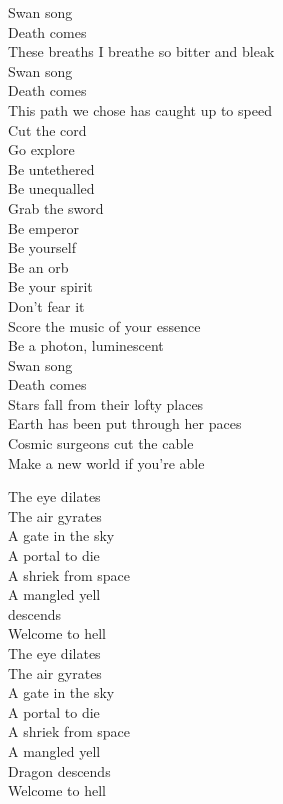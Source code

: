 Swan song\\
Death comes\\
These breaths I breathe so bitter and bleak\\
Swan song\\
Death comes\\
This path we chose has caught up to speed\\

Cut the cord\\
Go explore\\
Be untethered\\
Be unequalled\\
Grab the sword\\
Be emperor\\
Be yourself\\
Be an orb\\
Be your spirit\\
Don't fear it\\
Score the music of your essence\\
Be a photon, luminescent\\
Swan song\\
Death comes\\

Stars fall from their lofty places\\
Earth has been put through her paces\\
Cosmic surgeons cut the cable\\
Make a new world if you're able\\


The eye dilates\\
The air gyrates\\
A gate in the sky\\
A portal to die\\
A shriek from space\\
A mangled yell\\
 descends\\
Welcome to hell\\

The eye dilates\\
The air gyrates\\
A gate in the sky\\
A portal to die\\
A shriek from space\\
A mangled yell\\
Dragon descends\\
Welcome to hell\\

